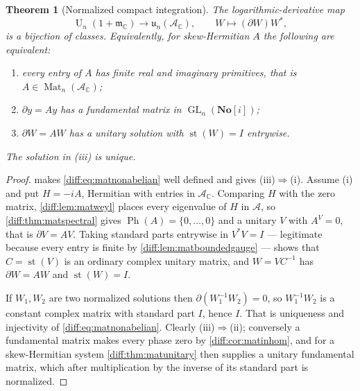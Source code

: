 \documentclass[11pt,letterpaper]{article}
\numberwithin{equation}{section}
\newtheorem{theorem}{Theorem}[section]
\theoremstyle{definition}
\theoremstyle{remark}
\newcommand{\SC}{\mathbf{No}[i]}
\newcommand{\C}{\mathbb C}
\newcommand{\der}{\partial}
\newcommand{\mm}{\mathfrak m}
\newcommand{\Acl}{\mathcal A}
\newcommand{\st}{\operatorname{st}}
\newcommand{\Mat}{\operatorname{Mat}}
\newcommand{\GL}{\operatorname{GL}}
\newcommand{\Un}{\operatorname{U}}
\newcommand{\Ph}{\operatorname{Ph}}
\begin{document}
\begin{theorem}[Normalized compact integration]
\label{diff:thm:matnonabelian}
The logarithmic-derivative map
\begin{equation}\label{diff:eq:matnonabelian}
 \Un_{n}(1+\mm_{\C})\longrightarrow\mathfrak u_{n}(\Acl_{\C}),
 \qquad W\longmapsto(\der W)W^{*},
\end{equation}
is a bijection of classes. Equivalently, for skew-Hermitian $A$ the following
are equivalent:
\begin{enumerate}[label=\textup{(\roman*)},leftmargin=2.4em]
\item every entry of $A$ has finite real and imaginary primitives, that is
$A\in\Mat_{n}(\Acl_{\C})$;
\item $\der y=Ay$ has a fundamental matrix in $\GL_{n}(\SC)$;
\item $\der W=AW$ has a unitary solution with $\st(W)=I$ entrywise.
\end{enumerate}
The solution in \textup{(iii)} is unique.
\end{theorem}
\begin{proof}
 makes \cref{diff:eq:matnonabelian} well defined
and gives (iii)$\Rightarrow$(i). Assume (i) and put $H=-iA$, Hermitian with
entries in $\Acl_{\C}$. Comparing $H$ with the zero matrix,
\cref{diff:lem:matweyl} places every eigenvalue of $H$ in $\Acl$, so
\cref{diff:thm:matspectral} gives $\Ph(A)=\{0,\dots,0\}$ and a unitary $V$
with $A^{V}=0$, that is $\der V=AV$. Taking standard parts entrywise in
$V^{*}V=I$ --- legitimate because every entry is finite by
\cref{diff:lem:matboundedgauge} --- shows that $C=\st(V)$ is an ordinary
complex unitary matrix, and $W=VC^{-1}$ has $\der W=AW$ and $\st(W)=I$.

If $W_{1},W_{2}$ are two normalized solutions then $\der(W_{1}^{-1}W_{2})=0$,
so $W_{1}^{-1}W_{2}$ is a constant complex matrix with standard part $I$,
hence $I$. That is uniqueness and injectivity of
\cref{diff:eq:matnonabelian}. Clearly (iii)$\Rightarrow$(ii); conversely a
fundamental matrix makes every phase zero by \cref{diff:cor:matinhom}, and for
a skew-Hermitian system \cref{diff:thm:matunitary} then supplies a unitary
fundamental matrix, which after multiplication by the inverse of its standard
part is normalized.
\end{proof}
\end{document}

